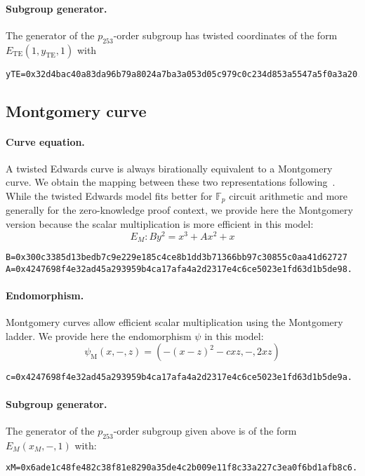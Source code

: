\documentclass{article}
\theoremstyle{definition}
\begin{document}
\paragraph{Subgroup generator.}
The generator of the $p_{253}$-order subgroup has twisted coordinates
of the form $E_\text{TE}(1,y_\text{TE},1)$ with
\begin{verbatim}
yTE=0x32d4bac40a83da96b79a8024a7ba3a053d05c979c0c234d853a5547a5f0a3a20.
\end{verbatim}

\subsection{Montgomery curve}
\paragraph{Curve equation.}
A twisted Edwards curve is always birationally equivalent to a
Montgomery curve. We obtain the mapping between these two
representations following~\cite{JCEng:CosSmi18}.
While the twisted Edwards model fits better for $\mathbb F_p$ circuit
arithmetic and more generally for the zero-knowledge proof context, we
provide here the Montgomery version because the scalar multiplication
is more efficient in this model:
$$E_M: By^2 = x^3 + Ax^2 + x$$
\begin{verbatim}
B=0x300c3385d13bedb7c9e229e185c4ce8b1dd3b71366bb97c30855c0aa41d62727
A=0x4247698f4e32ad45a293959b4ca17afa4a2d2317e4c6ce5023e1fd63d1b5de98.
\end{verbatim}

\paragraph{Endomorphism.}
Montgomery curves allow efficient scalar multiplication using the
Montgomery ladder. We provide here the endomorphism $\psi$ in this
model:
$$\psi_\text{M}(x,-,z) = (-(x-z)^2 - cxz, -, 2xz)$$
\begin{verbatim}
c=0x4247698f4e32ad45a293959b4ca17afa4a2d2317e4c6ce5023e1fd63d1b5de9a.
\end{verbatim}

\paragraph{Subgroup generator.}
The generator of the $p_{253}$-order subgroup given above is of the
form $E_M(x_M,-,1)$ with:
\begin{verbatim}
xM=0x6ade1c48fe482c38f81e8290a35de4c2b009e11f8c33a227c3ea0f6bd1afb8c6.
\end{verbatim}
\end{document}
